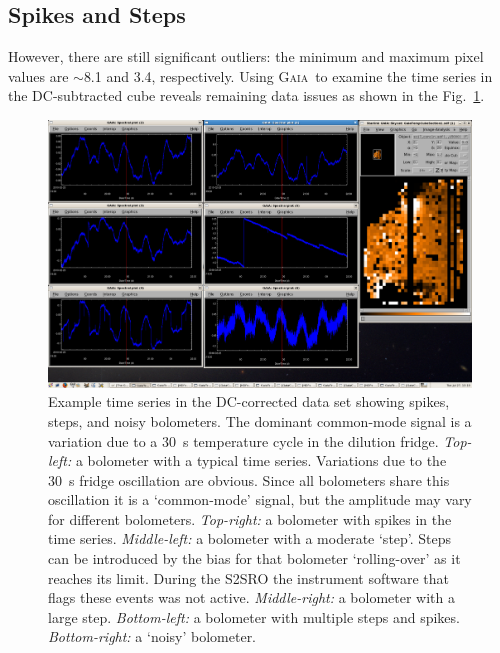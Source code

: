 \documentclass[twoside,11pt]{article}
\newcommand{\about}{$\sim$}
\newcommand{\xref}[3]{#1}
\newcommand{\xlabel}[1]{}
\renewcommand{\_}{\texttt{\symbol{95}}}
\newcommand{\gaia}{\xref{\textsc{Gaia}}{sun214}{}}
\begin{document}
\subsection{\xlabel{spikesteps}Spikes and Steps}
\label{sec:spikesteps}

However, there are still significant outliers: the minimum and maximum
pixel values are \about8.1 and 3.4, respectively. Using \gaia\ to examine
the time series in the DC-subtracted cube reveals remaining data issues as
shown in the Fig.~\ref{fig:timeseries}.

\begin{figure}[ht]
\begin{center}
\includegraphics[width=1.0\linewidth]{sc19_timeseries}
\caption{Example time series in the DC-corrected data set showing
spikes, steps, and noisy bolometers. The dominant common-mode signal is
a variation due to a 30~s temperature cycle in the dilution fridge.
\textsl{Top-left:} a bolometer with a typical time
series. Variations due to the 30~s fridge oscillation are
obvious. Since all bolometers share this oscillation it is a
`common-mode' signal, but the amplitude may vary for different
bolometers.
\textsl{Top-right:} a bolometer with spikes in the time
series. \textsl{Middle-left:} a bolometer with a moderate `step'. Steps
can be introduced by the bias for that bolometer `rolling-over' as it
reaches its limit. During the S2SRO the instrument software that flags
these events was not active.
\textsl{Middle-right:} a bolometer with a large step.
\textsl{Bottom-left:} a bolometer with multiple steps and
spikes.
\textsl{Bottom-right:} a `noisy' bolometer. }
\label{fig:timeseries}
\end{center}
\end{figure}
\end{document}

